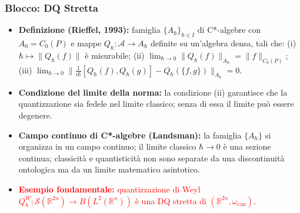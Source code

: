 \documentclass[12pt, a4paper]{article}
\begin{document}
	\subsubsection{Blocco: DQ Stretta}
	\begin{itemize}
		\item \textbf{Definizione (Rieffel, 1993):} famiglia $\{A_\hbar\}_{\hbar \in I}$ di C*-algebre con $A_0 = C_0(P)$ e mappe $Q_\hbar: \mathcal{A} \to A_\hbar$ definite su un'algebra densa, tali che: (i) $\hbar \mapsto \|Q_\hbar(f)\|$ è misurabile; (ii) $\lim_{\hbar\to 0}\|Q_\hbar(f)\|_{A_\hbar} = \|f\|_{C_0(P)}$; (iii) $\lim_{\hbar\to 0}\|\frac{1}{i\hbar}[Q_\hbar(f),Q_\hbar(g)] - Q_\hbar(\{f,g\})\|_{A_\hbar} = 0$.
		\item \textbf{Condizione del limite della norma:} la condizione (ii) garantisce che la quantizzazione sia fedele nel limite classico; senza di essa il limite può essere degenere.
		\item \textbf{Campo continuo di C*-algebre (Landsman):} la famiglia $\{A_\hbar\}$ si organizza in un campo continuo; il limite classico $\hbar\to 0$ è una sezione continua; classicità e quantisticità non sono separate da una discontinuità ontologica ma da un limite matematico asintotico.
		\item \textcolor{red}{\textbf{Esempio fondamentale:} quantizzazione di Weyl $Q^W_\hbar: \mathcal{S}(\mathbb{R}^{2n}) \to B(L^2(\mathbb{R}^n))$ è una DQ stretta di $(\mathbb{R}^{2n}, \omega_{\text{can}})$}.
	\end{itemize}
	
	
\end{document}
